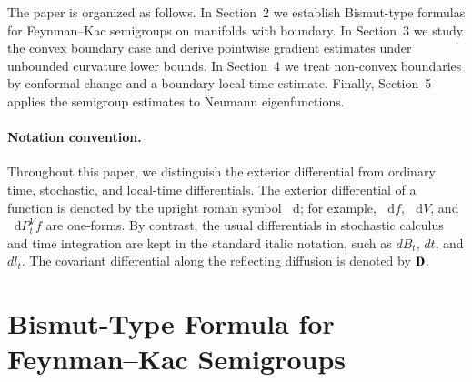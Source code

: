 \documentclass[11pt,twoside, reqno]{article}
\newcommand{\ed}{\mathop{}\!\mathrm{d}}
\newcommand\1{\mathbbm{1}}
\theoremstyle{definition}
\numberwithin{equation}{section}
\begin{document}
The paper is organized as follows. In Section~2 we establish Bismut-type
formulas for Feynman--Kac semigroups on manifolds with boundary. In
Section~3 we study the convex boundary case and derive pointwise gradient
estimates under unbounded curvature lower bounds. In Section~4 we treat
non-convex boundaries by conformal change and a boundary local-time estimate.
Finally, Section~5 applies the semigroup estimates to Neumann eigenfunctions.

\paragraph{Notation convention.}
Throughout this paper,  we distinguish the exterior differential from ordinary
time, stochastic, and local-time differentials. The exterior differential of a
function is denoted by the upright roman symbol \(\ed\); for example,
\(\ed f\), \(\ed V\), and \(\ed P_t^V f\) are one-forms. By contrast, the
usual differentials in stochastic calculus and time integration are kept in the
standard italic notation, such as \(dB_t\), \(dt\), and \(dl_t\). The covariant
differential along the reflecting diffusion is denoted by \({\bf D}\). 


\section{Bismut-Type Formula for Feynman--Kac Semigroups}
\end{document}
